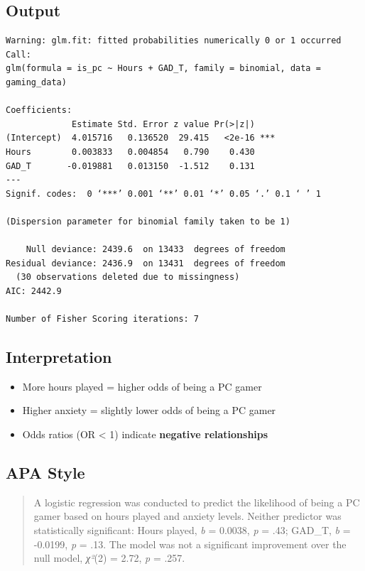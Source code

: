 \documentclass[
]{book}
\providecommand{\tightlist}{%
  \setlength{\itemsep}{0pt}\setlength{\parskip}{0pt}}
\begin{document}
\subsection{Output}\label{output-7}

\begin{verbatim}
Warning: glm.fit: fitted probabilities numerically 0 or 1 occurred
Call:
glm(formula = is_pc ~ Hours + GAD_T, family = binomial, data = gaming_data)

Coefficients:
             Estimate Std. Error z value Pr(>|z|)    
(Intercept)  4.015716   0.136520  29.415   <2e-16 ***
Hours        0.003833   0.004854   0.790    0.430    
GAD_T       -0.019881   0.013150  -1.512    0.131    
---
Signif. codes:  0 ‘***’ 0.001 ‘**’ 0.01 ‘*’ 0.05 ‘.’ 0.1 ‘ ’ 1

(Dispersion parameter for binomial family taken to be 1)

    Null deviance: 2439.6  on 13433  degrees of freedom
Residual deviance: 2436.9  on 13431  degrees of freedom
  (30 observations deleted due to missingness)
AIC: 2442.9

Number of Fisher Scoring iterations: 7
\end{verbatim}

\subsection{Interpretation}\label{interpretation-6}

\begin{itemize}
\tightlist
\item
  More hours played = higher odds of being a PC gamer
\item
  Higher anxiety = slightly lower odds of being a PC gamer
\item
  Odds ratios (OR \textless{} 1) indicate \textbf{negative relationships}
\end{itemize}

\subsection{APA Style}\label{apa-style-4}

\begin{quote}
A logistic regression was conducted to predict the likelihood of being a PC gamer based on hours played and anxiety levels. Neither predictor was statistically significant: Hours played, \emph{b} = 0.0038, \emph{p} = .43; GAD\_T, \emph{b} = -0.0199, \emph{p} = .13. The model was not a significant improvement over the null model, \emph{χ²}(2) = 2.72, \emph{p} = .257.
\end{quote}
\end{document}
